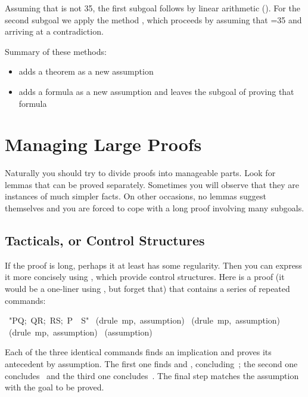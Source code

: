 Assuming that  is not 35, the first subgoal follows by linear arithmetic
(). For the second subgoal we apply the method , 
which proceeds by assuming that =35 and arriving at a contradiction.


\medskip
Summary of these methods:
\begin{itemize}
\item {} adds a theorem as a new assumption
\item {} adds a formula as a new assumption and leaves the
subgoal of proving that formula
\end{itemize}


\section{Managing Large Proofs}

Naturally you should try to divide proofs into manageable parts.  Look for lemmas
that can be proved separately.  Sometimes you will observe that they are
instances of much simpler facts.  On other occasions, no lemmas suggest themselves
and you are forced to cope with a long proof involving many subgoals.  

\subsection{Tacticals, or Control Structures}

If the proof is long, perhaps it at least has some regularity.  Then you can
express it more concisely using , which provide control
structures.  Here is a proof (it would be a one-liner using
, but forget that) that contains a series of repeated
commands:
%
\begin{isabelle}
\ "\isasymlbrakk P\isasymlongrightarrow Q;\
Q\isasymlongrightarrow R;\ R\isasymlongrightarrow S;\ P\isasymrbrakk \
\isasymLongrightarrow \ S"\isanewline
{}\ (drule\ mp,\ assumption)\isanewline
{}\ (drule\ mp,\ assumption)\isanewline
\isacommand{apply}\ (drule\ mp,\ assumption)\isanewline
\isacommand{apply}\ (assumption)\isanewline
\isacommand{done}
\end{isabelle}
%
Each of the three identical commands finds an implication and proves its
antecedent by assumption.  The first one finds  and
\isa{P}, concluding~\isa{Q}; the second one concludes~\isa{R} and the third one
concludes~\isa{S}.  The final step matches the assumption \isa{S} with the goal to
be proved.

